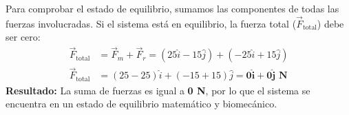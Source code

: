 \documentclass[12pt]{article}
\begin{document}
\begin{tcolorbox}
\begin{center}
    \end{center}

    \vspace{0.4cm}
    \begin{tcolorbox}[colback=medteal!10, colframe=medteal, arc=2mm, boxrule=1.2pt, title=\textbf{Desarrollo Matemático y Solución}]
        Para comprobar el estado de equilibrio, sumamos las componentes de todas las fuerzas involucradas. Si el sistema está en equilibrio, la fuerza total ($\vec{F}_{\text{total}}$) debe ser cero:
        \begin{align*}
            \vec{F}_{\text{total}} &= \vec{F}_m + \vec{F}_r = (25\hat{i} - 15\hat{j}) + (-25\hat{i} + 15\hat{j}) \\[1ex]
            \vec{F}_{\text{total}} &= (25 - 25)\hat{i} + (-15 + 15)\hat{j} = \mathbf{0\hat{i} + 0\hat{j} \text{ N}}
        \end{align*}
        \textbf{Resultado:} La suma de fuerzas es igual a \textbf{0 N}, por lo que el sistema se encuentra en un estado de equilibrio matemático y biomecánico.
    \end{tcolorbox}
    
\end{tcolorbox}
\end{document}
